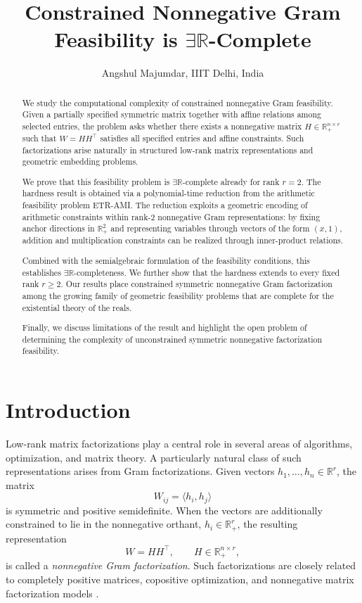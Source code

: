 \documentclass[11pt]{article}
\title{Constrained Nonnegative Gram Feasibility is $\exists\mathbb{R}$-Complete}
\author{Angshul Majumdar, IIIT Delhi, India}
\begin{document}
\maketitle

\begin{abstract}
    
We study the computational complexity of constrained nonnegative Gram feasibility.
Given a partially specified symmetric matrix together with affine relations among
selected entries, the problem asks whether there exists a nonnegative matrix
$H \in \mathbb{R}_+^{n\times r}$ such that $W = HH^\top$ satisfies all specified
entries and affine constraints. Such factorizations arise naturally in structured
low-rank matrix representations and geometric embedding problems.

We prove that this feasibility problem is $\exists\mathbb{R}$-complete already
for rank $r=2$. The hardness result is obtained via a polynomial-time reduction
from the arithmetic feasibility problem \textsc{ETR-AMI}. The reduction exploits
a geometric encoding of arithmetic constraints within rank-$2$ nonnegative Gram
representations: by fixing anchor directions in $\mathbb{R}_+^2$ and representing
variables through vectors of the form $(x,1)$, addition and multiplication
constraints can be realized through inner-product relations.

Combined with the semialgebraic formulation of the feasibility conditions, this
establishes $\exists\mathbb{R}$-completeness. We further show that the hardness
extends to every fixed rank $r\ge 2$. Our results place constrained symmetric
nonnegative Gram factorization among the growing family of geometric feasibility
problems that are complete for the existential theory of the reals.

Finally, we discuss limitations of the result and highlight the open problem of
determining the complexity of unconstrained symmetric nonnegative factorization
feasibility.
\end{abstract}




\section{Introduction}
\label{sec:intro}

Low-rank matrix factorizations play a central role in several areas of algorithms,
optimization, and matrix theory. A particularly natural class of such
representations arises from Gram factorizations.
Given vectors $h_1,\dots,h_n \in \mathbb{R}^r$, the matrix
\[
W_{ij} = \langle h_i , h_j \rangle
\]
is symmetric and positive semidefinite. When the vectors are additionally
constrained to lie in the nonnegative orthant, $h_i \in \mathbb{R}_+^r$,
the resulting representation
\[
W = HH^\top, \qquad H \in \mathbb{R}_+^{n\times r},
\]
is called a \emph{nonnegative Gram factorization}.
Such factorizations are closely related to completely positive matrices,
copositive optimization, and nonnegative matrix factorization models
\cite{berman2003cp,bomze2018copositive,cohen1993nonnegativerank,
vavasis2009complexity,lee1999nmf}.
\end{document}
